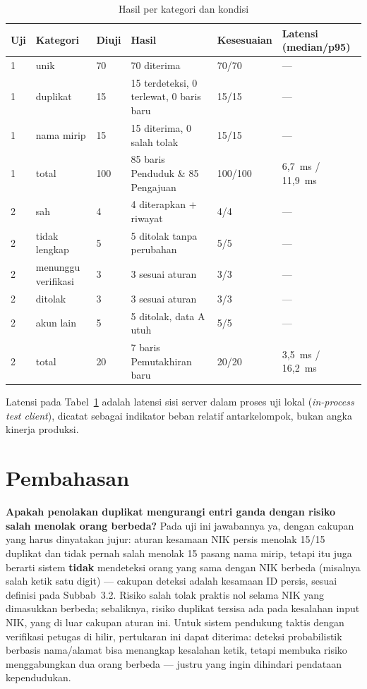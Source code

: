 \documentclass[11pt,a4paper]{article}
\begin{document}
\begin{table}[htbp]
\centering
\footnotesize
\renewcommand{\arraystretch}{1.25}
\begin{tabular}{@{}p{1.1cm}p{3.1cm}p{1.3cm}p{5.1cm}p{1.7cm}p{2.6cm}@{}}
\toprule
\textbf{Uji} & \textbf{Kategori} & \textbf{Diuji} & \textbf{Hasil} & \textbf{Kesesuaian} & \textbf{Latensi (median/p95)} \\
\midrule
1 & unik & 70 & 70 diterima & 70/70 & --- \\
1 & duplikat & 15 & 15 terdeteksi, 0 terlewat, 0 baris baru & 15/15 & --- \\
1 & nama mirip & 15 & 15 diterima, 0 salah tolak & 15/15 & --- \\
1 & total & 100 & 85 baris Penduduk \& 85 Pengajuan & 100/100 & 6,7~ms / 11,9~ms \\
2 & sah & 4 & 4 diterapkan + riwayat & 4/4 & --- \\
2 & tidak lengkap & 5 & 5 ditolak tanpa perubahan & 5/5 & --- \\
2 & menunggu verifikasi & 3 & 3 sesuai aturan & 3/3 & --- \\
2 & ditolak & 3 & 3 sesuai aturan & 3/3 & --- \\
2 & akun lain & 5 & 5 ditolak, data A utuh & 5/5 & --- \\
2 & total & 20 & 7 baris Pemutakhiran baru & 20/20 & 3,5~ms / 16,2~ms \\
\bottomrule
\end{tabular}
\caption{Hasil per kategori dan kondisi}
\label{tab:t2}
\end{table}

Latensi pada Tabel~\ref{tab:t2} adalah latensi sisi server dalam proses uji lokal (\emph{in-process test client}), dicatat sebagai indikator beban relatif antarkelompok, bukan angka kinerja produksi.

\section{Pembahasan}

\textbf{Apakah penolakan duplikat mengurangi entri ganda dengan risiko salah menolak orang berbeda?} Pada uji ini jawabannya ya, dengan cakupan yang harus dinyatakan jujur: aturan kesamaan NIK persis menolak 15/15 duplikat dan tidak pernah salah menolak 15 pasang nama mirip, tetapi itu juga berarti sistem \textbf{tidak} mendeteksi orang yang sama dengan NIK berbeda (misalnya salah ketik satu digit) --- cakupan deteksi adalah kesamaan ID persis, sesuai definisi pada Subbab~3.2. Risiko salah tolak praktis nol selama NIK yang dimasukkan berbeda; sebaliknya, risiko duplikat tersisa ada pada kesalahan input NIK, yang di luar cakupan aturan ini. Untuk sistem pendukung taktis dengan verifikasi petugas di hilir, pertukaran ini dapat diterima: deteksi probabilistik berbasis nama/alamat \cite{christen2012,christen2007} bisa menangkap kesalahan ketik, tetapi membuka risiko menggabungkan dua orang berbeda --- justru yang ingin dihindari pendataan kependudukan.
\end{document}
